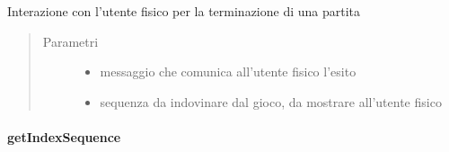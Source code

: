 \documentclass[letterpaper,10pt,italian,openany,oneside]{sphinxmanual}
\begin{document}
\begin{fulllineitems}
\label{\detokenize{test/it/unicam/cs/pa/mastermind/ui/GameView:it.unicam.cs.pa.mastermind.ui.GameView.endingScreen(String, List)}}
Interazione con l’utente fisico per la terminazione di una partita
\begin{quote}\begin{description}
\item[{Parametri}] \leavevmode\begin{itemize}
\item {} 
 \textendash{} messaggio che comunica all’utente fisico l’esito

\item {} 
 \textendash{} sequenza da indovinare dal gioco, da mostrare all’utente fisico

\end{itemize}

\end{description}\end{quote}

\end{fulllineitems}



\paragraph{getIndexSequence}
\label{\detokenize{test/it/unicam/cs/pa/mastermind/ui/GameView:getindexsequence}}
\end{document}
